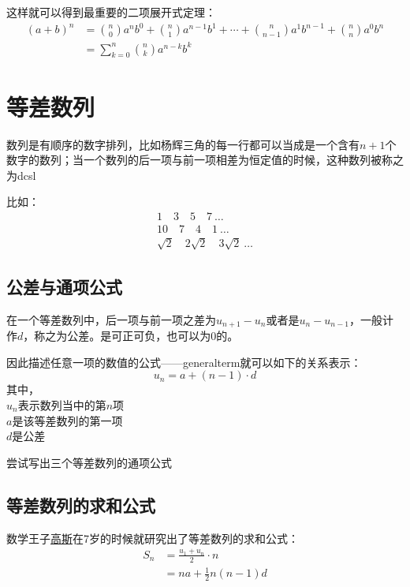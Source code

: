 这样就可以得到最重要的二项展开式定理：
\begin{align*}
	(a+b)^n &={n\choose 0}a^{n}b^0+{n\choose 1}a^{n-1}b^1+\cdots + {n\choose n-1}a^1b^{n-1}+ {n\choose n}a^0 b^{n}\\
	        &=\sum_{k=0}^{n}{n\choose k}a^{n-k}b^k
\end{align*}
\clearpage

\section{等差数列}
\label{sec:Arithmetic Progression}
数列是有顺序的数字排列，比如杨辉三角的每一行都可以当成是一个含有$n+1$个数字的数列；当一个数列的后一项与前一项相差为恒定值的时候，这种数列被称之为\gls{dcsl}

比如：
\begin{align*}
1\quad 3\quad 5\quad 7 \  \ldots \\
10\quad 7 \quad 4\quad 1 \ \ldots \\
\sqrt 2 \quad 2\sqrt2 \quad 3\sqrt2 \ \ldots
\end{align*}

\subsection*{公差与通项公式}
\label{subsec:Common Difference and General Term}
在一个等差数列中，后一项与前一项之差为$u_{n+1}-u_{n}$或者是$u_{n}-u_{n-1}$，一般计作$d$，称之为公差。是可正可负，也可以为0的。

因此描述任意一项的数值的公式——\gls{generalterm}就可以如下的关系表示：
\[
	u_n=a+(n-1)\cdot d
\]
其中，\\
$u_n$表示数列当中的第$n$项\\
$a$是该等差数列的第一项\\
$d$是公差

\begin{TaskBox}
尝试写出三个等差数列的通项公式
\end{TaskBox}


\subsection*{等差数列的求和公式}
\label{Sum of Arithmetic}
数学王子\href{https://en.wikipedia.org/wiki/Carl_Friedrich_Gauss#Algebra}{高斯}在7岁的时候就研究出了等差数列的求和公式：
\begin{align*}
	S_n &= \frac{u_1+u_n}{2}\cdot n\\
	    &=na+\frac{1}{2}n(n-1)d
\end{align*}

